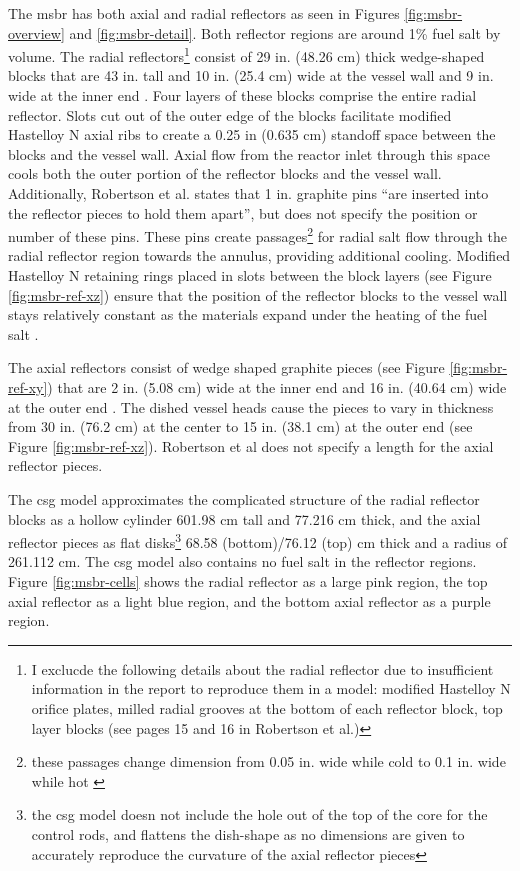 The \Gls{msbr} has both axial and radial reflectors as seen in Figures
\ref{fig:msbr-overview} and \ref{fig:msbr-detail}. Both reflector regions are around 1\% fuel salt by volume. The radial
reflectors\footnote{I exclucde the following details about the radial reflector
due to insufficient information in the report to reproduce them in a model:
modified Hastelloy N orifice plates, milled radial grooves at the bottom of each
reflector block, top layer blocks (see pages 15 and 16 in Robertson et al.)}
consist of 29 in. (48.26 cm) thick wedge-shaped blocks that are 43 in. tall and 10 in. (25.4 cm) wide at the vessel wall and 9 in. wide at the inner end \cite{robertson_conceptual_1971}.
Four layers of these blocks comprise the entire radial reflector. Slots cut out
of the outer edge of the blocks facilitate modified Hastelloy N axial ribs to create a
0.25 in (0.635 cm) standoff space between the blocks and the vessel wall. Axial
flow from the reactor inlet through this space cools both the outer portion of
the reflector blocks and the vessel wall. Additionally, Robertson et al. states
that 1 in. graphite pins ``are inserted into the reflector pieces to hold them
apart'', but does not specify the position or number of these pins. These pins
create passages\footnote{these passages change dimension from 0.05 in. wide
while cold to 0.1 in. wide while hot \cite{robertson_conceptual_1971}} for
radial salt flow through the radial reflector region towards the annulus,
providing additional cooling. Modified Hastelloy N retaining rings placed in slots
between the block layers (see Figure \ref{fig:msbr-ref-xz}) ensure that the
position of the reflector blocks to the vessel wall stays relatively constant as
the materials expand under the heating of the fuel salt
\cite{robertson_conceptual_1971}.

The axial reflectors consist of wedge shaped graphite pieces (see Figure
\ref{fig:msbr-ref-xy}) that are 2 in. (5.08 cm) wide at the inner end and 16 in.
(40.64 cm) wide at the outer end \cite{robertson_conceptual_1971}. The dished
vessel heads cause the pieces to vary in thickness from 30 in. (76.2 cm) at the
center to 15 in. (38.1 cm) at the outer end (see Figure
\ref{fig:msbr-ref-xz})\cite{robertson_conceptual_1971}. Robertson et al does not
specify a length for the axial reflector pieces. 

The \Gls{csg} model approximates the complicated structure of the radial
reflector blocks as a hollow cylinder 601.98 cm tall and 77.216 cm thick, and
the axial reflector pieces as flat disks\footnote{the \Gls{csg} model doesn not
include the hole out of the top of the core for the control rods, and flattens
the dish-shape as no dimensions are given to accurately reproduce the curvature
of the axial reflector pieces} 68.58 (bottom)/76.12 (top) cm thick and a radius
of 261.112 cm. The \Gls{csg} model also contains no fuel salt in the reflector
regions. Figure \ref{fig:msbr-cells} shows the radial reflector as a large pink
region, the top axial reflector as a light blue region, and the bottom axial
reflector as a purple region.

